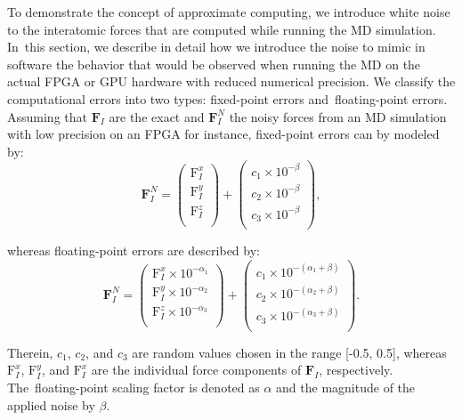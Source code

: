 \documentclass[computation,article,accept,moreauthors,pdftex]{Definitions/mdpi}
\begin{document}
To demonstrate the concept of approximate computing, we introduce white noise to the interatomic forces that are computed while running the MD simulation. In~this section, we describe in detail how we introduce the noise to mimic in software the behavior that would be observed when running the MD on the actual FPGA or GPU hardware with reduced numerical precision. We classify the computational errors into two types: fixed-point errors and~floating-point errors. Assuming that $\textbf{F}_{I}$ are the exact and $\textbf{F}_{I}^{N}$ the noisy forces from {an MD simulation} with low precision on an FPGA for instance, fixed-point errors can by modeled by:
\begin{equation}
\textbf{F}_{I}^{N}=
\begin{pmatrix}
\text{F}_{I}^{x}\\
\text{F}_{I}^{y}\\
\text{F}_{I}^{z}\\
\end{pmatrix} +
\begin{pmatrix}
c_{1} \times 10^{-\beta }\\
c_{2} \times 10^{-\beta }\\
c_{3} \times 10^{-\beta }\\
\end{pmatrix}
,
\end{equation}

\noindent whereas floating-point errors are described by:
\begin{equation}
\textbf{F}_{I}^{N} =
\begin{pmatrix}
\text{F}_{I}^{x} \times 10^{-\alpha_1}\\
\text{F}_{I}^{y} \times 10^{-\alpha_2}\\
\text{F}_{I}^{z} \times 10^{-\alpha_3}\\
\end{pmatrix} +
\begin{pmatrix}
c_{1} \times 10^{-(\alpha_1+\beta)}\\
c_{2} \times 10^{-(\alpha_2+\beta)}\\
c_{3} \times 10^{-(\alpha_3+\beta)}\\
\end{pmatrix}
.
\end{equation}

 Therein, $c_1$, $c_2$, and $c_3$ are random values chosen in the range [-0.5, 0.5], whereas $\text{F}_{I}^{x}$, $\text{F}_{I}^{y}$, and $\text{F}_{I}^{x}$ are the individual force components of $\textbf{F}_{I}$, respectively. The~floating-point scaling factor is denoted as $\alpha$ and the magnitude of the applied noise by \(\beta\).
\end{document}
